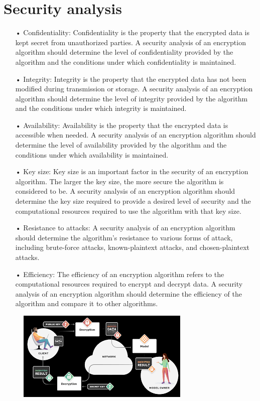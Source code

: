 \documentclass[a4paper,11pt]{report}
\begin{document}
\section{Security analysis}
\begin{itemize}
\item[•] Confidentiality: Confidentiality is the property that the encrypted data is kept secret from unauthorized parties. A security analysis of an encryption algorithm should determine the level of confidentiality provided by the algorithm and the conditions under which confidentiality is maintained.
\item[•] Integrity: Integrity is the property that the encrypted data has not been modified during transmission or storage. A security analysis of an encryption algorithm should determine the level of integrity provided by the algorithm and the conditions under which integrity is maintained.
\item[•] Availability: Availability is the property that the encrypted data is accessible when needed. A security analysis of an encryption algorithm should determine the level of availability provided by the algorithm and the conditions under which availability is maintained.

\item[•] Key size: Key size is an important factor in the security of an encryption algorithm. The larger the key size, the more secure the algorithm is considered to be. A security analysis of an encryption algorithm should determine the key size required to provide a desired level of security and the computational resources required to use the algorithm with that key size.

\item[•] Resistance to attacks: A security analysis of an encryption algorithm should determine the algorithm's resistance to various forms of attack, including brute-force attacks, known-plaintext attacks, and chosen-plaintext attacks.

\item[•] Efficiency: The efficiency of an encryption algorithm refers to the computational resources required to encrypt and decrypt data. A security analysis of an encryption algorithm should determine the efficiency of the algorithm and compare it to other algorithms.
\end{itemize}
 \begin{figure}[h]
	\centering
	\hspace{21pt}
	\includegraphics[width=.70\linewidth]{security.png}
	\label{fig:security.png}
\end{figure}
\end{document}
